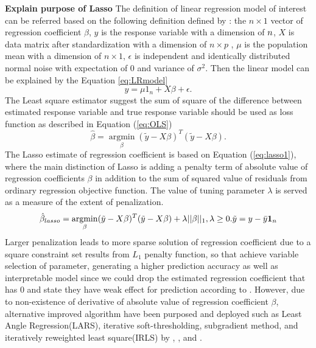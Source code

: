 \textbf{Explain purpose of Lasso}
The definition of linear regression model of interest can be referred based on the following definition defined by \cite{tibshirani_1996}: the $n \times 1$ vector of regression coefficient $\beta$,  $y$ is the response variable with a dimension of $n \time 1$, $X$ is data matrix after standardization with a dimension of $n \times p$ , $\mu$ is the population mean with a dimension of $n \times 1$, $\epsilon$ is independent and identically distributed normal noise with expectation of 0 and variance of $\sigma^2$. Then the linear model can be explained by the Equation \ref{eq:LRmodel}
\begin{equation}
	\label{eq:LRmodel}
	y = \mu 1_n + X\beta + \epsilon.
\end{equation} 
The Least square estimator suggest the sum of square of the difference between estimated response variable and true response variable should be used as loss function as described in Equation (\ref{eq:OLS})
\begin{equation}
	\label{eq:OLS}
	\hat{\beta} = \underset{\beta}{\operatorname{argmin}}  (\tilde{y} - X\beta)^T(\tilde{y}-X\beta).
\end{equation}
 The Lasso estimate of regression coefficient is based on Equation (\ref{eq:lasso1}), where the main distinction of Lasso is adding a penalty term of absolute value of regression coefficients $\beta$ in addition to the sum of squared value of residuals from ordinary regression objective function. The value of tuning parameter $\lambda$ is served as a measure of the extent of penalization.
 \begin{equation}
 	\label{eq:lasso1}
 	\hat{\beta}_{lasso} = \underset{\beta}{\operatorname{argmin}} (\tilde{y}-X\beta)^T(\tilde{y}-X\beta) + \lambda ||\beta||_1, \lambda \geq 0. \tilde{y} =  y - \bar{y}\textbf{1}_n \\
 \end{equation}
 Larger penalization leads to more sparse solution of regression coefficient due to a square constraint set results from $L_1$ penalty function, so that achieve variable selection of parameter, generating a higher prediction accuracy as well as interpretable model since we could drop the estimated regression coefficient that has 0 and state they have weak effect for prediction according to \cite{tibshirani_1996}.
However, due to non-existence of derivative of absolute value of regression coefficient $\beta$, alternative improved algorithm have been purposed and deployed such as Least Angle Regression(LARS), iterative soft-thresholding, subgradient method, and iteratively reweighted least square(IRLS) by \cite{efron_hastie_johnstone_tibshirani_2004},   \cite{beck_teboulle_2009}, \cite{nan_zhang_shuqing_zeng_2005} and \cite{friedman_hastie_tibshirani_2010}.

